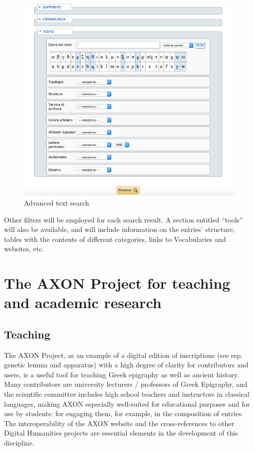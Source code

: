 \documentclass[amsthm,ebook]{saparticle}
\begin{document}
\begin{figure}[!bp]
\centering
 \includegraphics[width=\columnwidth]{EAGLE2016FullPaperrevised-img005.png}
\caption{Advanced text search}
\label{fig:5}
\end{figure}


Other filters will be employed for each search result. A section entitled ``tools'' will also be available, and will
include information on the entries’ structure, tables with the contents of different categories, links to Vocabularies
and websites, etc. 

\section{The AXON Project for teaching and academic research}




\subsection{Teaching}





The AXON Project, as an example of a digital edition of inscriptions (see esp. genetic lemma and apparatus) with a high
degree of clarity for contributors and users, is a useful tool for teaching Greek epigraphy as well as ancient history.
Many contributors are university lecturers / professors of Greek Epigraphy, and the scientific committee includes high
school teachers and instructors in classical languages, making AXON especially well-suited for educational purposes and
for use by students: for engaging them, for example, in the composition of entries. The interoperability of the AXON
website and the cross-references to other Digital Humanities projects are essential elements in the development of this
discipline. 
\end{document}
